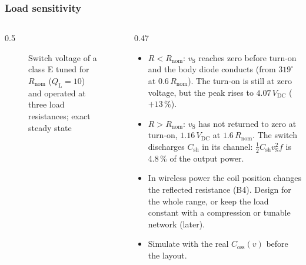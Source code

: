 \begin{frame}
	\frametitle{Load sensitivity}
	\begin{columns}[T]
		\begin{column}{0.5\textwidth}
			\begin{figure}
				\centering
				\caption{Switch voltage of a class E tuned for $R_\mathrm{nom}$ ($Q_\mathrm{L}=10$) and operated at three load resistances; exact steady state}
			\end{figure}
		\end{column}
		\begin{column}{0.47\textwidth}
			\footnotesize
			\begin{itemize}
				\item $R<R_\mathrm{nom}$: $v_\mathrm{S}$ reaches zero before turn-on and the body diode conducts (from $319^\circ$ at $0.6\,R_\mathrm{nom}$). The turn-on is still at zero voltage, but the peak rises to $4.07\,V_\mathrm{DC}$ ($+13$\,\%).
				\item $R>R_\mathrm{nom}$: $v_\mathrm{S}$ has not returned to zero at turn-on, $1.16\,V_\mathrm{DC}$ at $1.6\,R_\mathrm{nom}$. The switch discharges $C_\mathrm{sh}$ in its channel: $\tfrac12C_\mathrm{sh}v_\mathrm{S}^2f$ is 4.8\,\% of the output power.
				\item In wireless power the coil position changes the reflected resistance (B4). Design for the whole range, or keep the load constant with a compression or tunable network (later).
				\item Simulate with the real $C_\mathrm{oss}(v)$ before the layout.
			\end{itemize}
		\end{column}
	\end{columns}
\end{frame}

